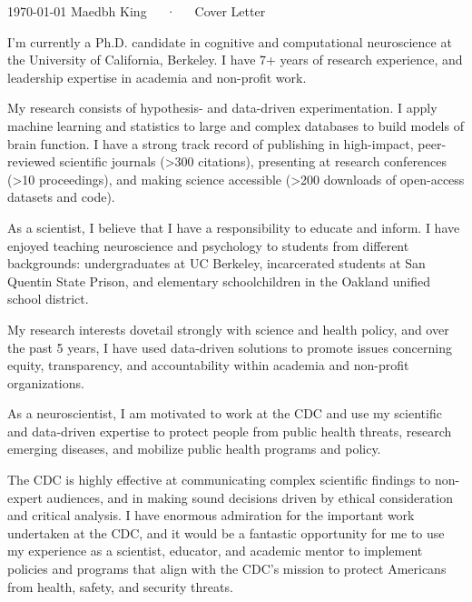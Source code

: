 \documentclass[11pt, a4paper]{maedbh-cv}
\begin{document}
\makecvheader[R]

\makecvfooter
  {\today}
  {Maedbh King~~~·~~~Cover Letter}
  {}

\makelettertitle

\begin{cvletter}

I'm currently a Ph.D. candidate in cognitive and computational neuroscience at the University of California, Berkeley. I have 7+ years of research experience, and leadership expertise in academia and non-profit work. 

	My research consists of hypothesis- and data-driven experimentation. I apply machine learning and statistics to large and complex databases to build models of brain function. I have a strong track record of publishing in high-impact, peer-reviewed scientific journals (>300 citations), presenting at research conferences (>10 proceedings), and making science accessible (>200 downloads of open-access datasets and code). 

	As a scientist, I believe that I have a responsibility to educate and inform. I have enjoyed teaching neuroscience and psychology to students from different backgrounds: undergraduates at UC Berkeley, incarcerated students at San Quentin State Prison, and elementary schoolchildren in the Oakland unified school district. 
	
	My research interests dovetail strongly with science and health policy, and over the past 5 years, I have used data-driven solutions to promote issues concerning equity, transparency, and accountability within academia and non-profit organizations.  


As a neuroscientist, I am motivated to work at the CDC and use my scientific and data-driven expertise to protect people from public health threats, research emerging diseases, and mobilize public health programs and policy.  

The CDC is highly effective at communicating complex scientific findings to non-expert audiences, and in making sound decisions driven by ethical consideration and critical analysis.
I have enormous admiration for the important work undertaken at the CDC, and it would be a fantastic opportunity for me to use my experience as a scientist, educator, and academic mentor to implement policies and programs that align with the CDC's mission to protect Americans from health, safety, and security threats.  


\end{cvletter}
\end{document}
